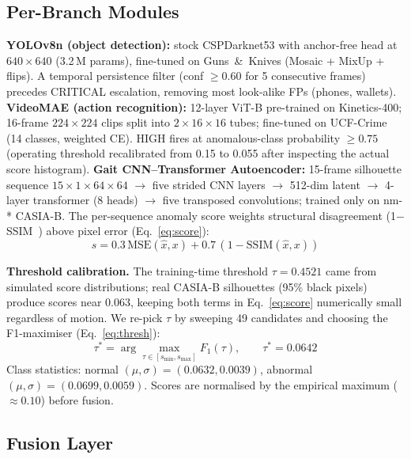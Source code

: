 \documentclass[runningheads]{llncs}
\begin{document}
\FloatBarrier

\subsection{Per-Branch Modules}

\textbf{YOLOv8n (object detection):} stock CSPDarknet53 with anchor-free head at $640{\times}640$ (3.2\,M params), fine-tuned on Guns~\&~Knives (Mosaic + MixUp + flips). A temporal persistence filter (conf $\geq 0.60$ for 5 consecutive frames) precedes CRITICAL escalation, removing most look-alike FPs (phones, wallets). \textbf{VideoMAE (action recognition):} 12-layer ViT-B pre-trained on Kinetics-400; 16-frame $224{\times}224$ clips split into $2{\times}16{\times}16$ tubes; fine-tuned on UCF-Crime (14 classes, weighted CE). HIGH fires at anomalous-class probability $\geq 0.75$ (operating threshold recalibrated from 0.15 to 0.055 after inspecting the actual score histogram). \textbf{Gait CNN--Transformer Autoencoder:} 15-frame silhouette sequence $15{\times}1{\times}64{\times}64$ $\to$ five strided CNN layers $\to$ 512-dim latent $\to$ 4-layer transformer (8 heads) $\to$ five transposed convolutions; trained only on nm-* CASIA-B. The per-sequence anomaly score weights structural disagreement (1$-$SSIM~\cite{wang2004ssim}) above pixel error (Eq.~\ref{eq:score}):
\begin{equation}
  s = 0.3\,\text{MSE}(\hat{x}, x) + 0.7\,(1 - \text{SSIM}(\hat{x}, x))
  \label{eq:score}
\end{equation}

\textbf{Threshold calibration.} The training-time threshold $\tau = 0.4521$ came from simulated score distributions; real CASIA-B silhouettes (95\% black pixels) produce scores near 0.063, keeping both terms in Eq.~\ref{eq:score} numerically small regardless of motion. We re-pick $\tau$ by sweeping 49 candidates and choosing the F1-maximiser (Eq.~\ref{eq:thresh}):
\begin{equation}
  \tau^* = \arg\max_{\tau \in [s_{\min}, s_{\max}]} F_1(\tau), \qquad \tau^* = 0.0642
  \label{eq:thresh}
\end{equation}
Class statistics: normal $(\mu,\sigma)=(0.0632, 0.0039)$, abnormal $(\mu,\sigma)=(0.0699, 0.0059)$. Scores are normalised by the empirical maximum ($\approx 0.10$) before fusion.

\subsection{Fusion Layer}\label{sec:fusion}
\end{document}
